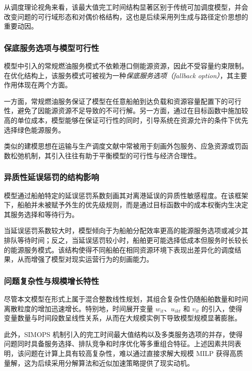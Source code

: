\documentclass[UTF8, a4paper, 12pt]{ctexart}
\begin{document}
从调度理论视角来看，该最大值完工时间结构显著区别于传统可加调度模型，并会改变问题的可行域形态和对偶价格结构，这也是后续采用列生成与路径定价思想的重要动因。

\subsubsection{保底服务选项与模型可行性}

模型中引入的常规燃油服务模式不依赖港口侧能源资源，因此不受容量约束限制。在优化结构上，该服务模式可被视为一种\emph{保底服务选项（fallback option）}，其主要作用体现在两个方面。

一方面，常规燃油服务保证了模型在任意船舶到达负载和资源容量配置下的可行性，避免了因能源资源不足导致的不可行解。另一方面，通过在目标函数中施加较高的单位成本，模型能够在保证可行性的同时，引导系统在资源允许的条件下优先选择绿色能源服务。

类似的建模思想在运输与生产调度文献中常被用于刻画外包服务、应急资源或罚函数松弛机制，其引入往往有助于平衡模型的可行性与经济合理性。

\subsubsection{异质性延误惩罚的结构影响}

模型通过船舶特定的延误惩罚系数刻画其对离港延误的异质性敏感程度。在该框架下，船舶并未被赋予外生的优先级规则，而是通过目标函数中的成本权衡内生决定其服务选择和等待行为。

当延误惩罚系数较大时，模型倾向于为船舶分配效率更高的能源服务选项或减少其排队等待时间；反之，当延误惩罚较小时，船舶更可能选择低成本但服务时长较长的能源服务模式。该结构使得不同船舶在相同资源环境下表现出差异化的调度结果，从而增强了模型对现实运营行为的刻画能力。

\subsubsection{问题复杂性与规模增长特性}

尽管本文模型在形式上属于混合整数线性规划，其组合复杂性仍随船舶数量和时间离散粒度的增加迅速增长。特别地，时间展开变量 $w_{it}$、$u_{ikt}$ 和 $v_{it}$ 的引入，使得变量数量与时间段数呈线性关系，从而在大规模实例下导致模型规模显著膨胀。

此外，SIMOPS 机制引入的完工时间最大值结构以及多类服务选项的并存，使得问题同时具备服务选择、排队竞争和时序优化等多重组合特征。上述因素共同表明，该问题在计算上具有较高复杂性，难以通过直接求解大规模 MILP 获得高质量解，这为后续采用分解算法和近似加速策略提供了现实动机。
\end{document}

